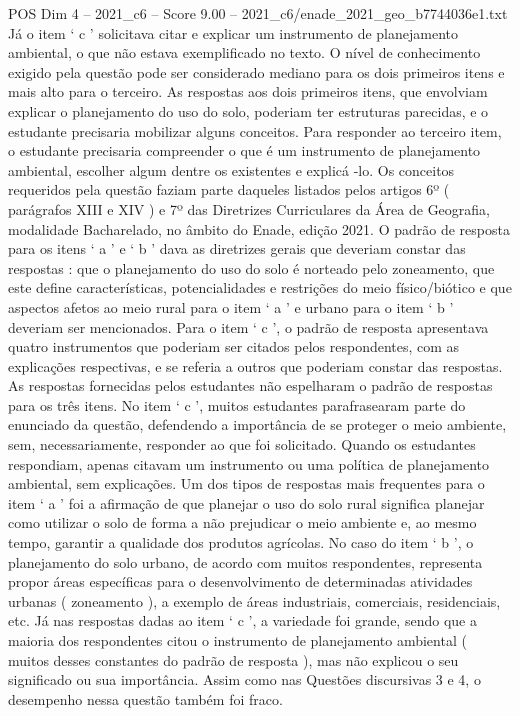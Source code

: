 \begin{textsample}{POS Dim 4 – 2021\_c6 – Score 9.00 – 2021\_c6/enade\_2021\_geo\_b7744036e1.txt}
Já o item ‘ c ’ solicitava citar e explicar um instrumento de planejamento ambiental, o que não estava exemplificado no texto.
O nível de conhecimento exigido pela questão pode ser considerado mediano para os dois primeiros itens e mais alto para o terceiro.
As respostas aos dois primeiros itens, que envolviam explicar o planejamento do uso do solo, poderiam ter estruturas parecidas, e o estudante precisaria mobilizar alguns conceitos.
Para responder ao terceiro item, o estudante precisaria compreender o que é um instrumento de planejamento ambiental, escolher algum dentre os existentes e explicá -lo.
Os conceitos requeridos pela questão faziam parte daqueles listados pelos artigos 6º ( parágrafos XIII e XIV ) e 7º das Diretrizes Curriculares da Área de Geografia, modalidade Bacharelado, no âmbito do Enade, edição 2021.
O padrão de resposta para os itens ‘ a ’ e ‘ b ’ dava as diretrizes gerais que deveriam constar das respostas : que o planejamento do uso do solo é norteado pelo zoneamento, que este define características, potencialidades e restrições do meio físico/biótico e que aspectos afetos ao meio rural para o item ‘ a ’ e urbano para o item ‘ b ’ deveriam ser mencionados.
Para o item ‘ c ’, o padrão de resposta apresentava quatro instrumentos que poderiam ser citados pelos respondentes, com as explicações respectivas, e se referia a outros que poderiam constar das respostas.
As respostas fornecidas pelos estudantes não espelharam o padrão de respostas para os três itens.
No item ‘ c ’, muitos estudantes parafrasearam parte do enunciado da questão, defendendo a importância de se proteger o meio ambiente, sem, necessariamente, responder ao que foi solicitado.
Quando os estudantes respondiam, apenas citavam um instrumento ou uma política de planejamento ambiental, sem explicações.
Um dos tipos de respostas mais frequentes para o item ‘ a ’ foi a afirmação de que planejar o uso do solo rural significa planejar como utilizar o solo de forma a não prejudicar o meio ambiente e, ao mesmo tempo, garantir a qualidade dos produtos agrícolas.
No caso do item ‘ b ’, o planejamento do solo urbano, de acordo com muitos respondentes, representa propor áreas específicas para o desenvolvimento de determinadas atividades urbanas ( zoneamento ), a exemplo de áreas industriais, comerciais, residenciais, etc.
Já nas respostas dadas ao item ‘ c ’, a variedade foi grande, sendo que a maioria dos respondentes citou o instrumento de planejamento ambiental ( muitos desses constantes do padrão de resposta ), mas não explicou o seu significado ou sua importância.
Assim como nas Questões discursivas 3 e 4, o desempenho nessa questão também foi fraco.

\end{textsample}
